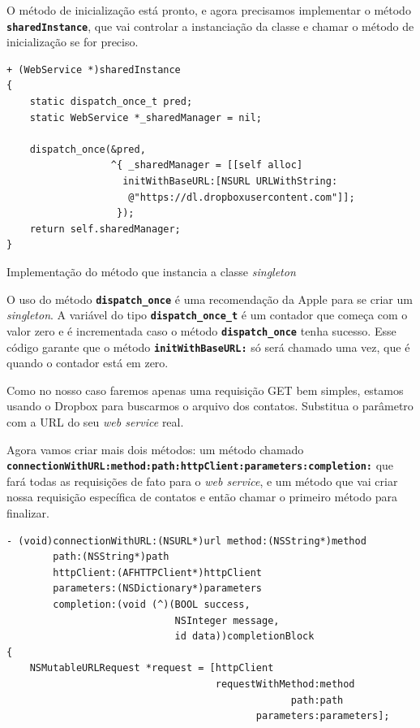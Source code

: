 \documentclass[a4paper,12pt,brazil,doubleside]{book}
\begin{document}
\begin{singlespace}
O método de inicialização está pronto, e agora precisamos implementar o método\\ \texttt{\textbf{sharedInstance}}, que vai controlar a instanciação da classe e chamar o método de inicialização se for preciso.

\begin{listing}[H]
\begin{verbatim}
+ (WebService *)sharedInstance
{
    static dispatch_once_t pred;
    static WebService *_sharedManager = nil;
    
    dispatch_once(&pred,
                  ^{ _sharedManager = [[self alloc]
                    initWithBaseURL:[NSURL URLWithString:
                     @"https://dl.dropboxusercontent.com"]];
                   });
    return self.sharedManager;
}
\end{verbatim}
\caption{Implementação do método que instancia a classe \emph{singleton}}
\end{listing}


O uso do método \texttt{\textbf{dispatch\_once}} é uma recomendação da Apple para se criar um \emph{singleton}. A variável do tipo \texttt{\textbf{dispatch\_once\_t}} é um contador que começa com o valor zero e é incrementada caso o método \texttt{\textbf{dispatch\_once}} tenha sucesso. Esse código garante que o método \texttt{\textbf{initWithBaseURL:}} só será chamado uma vez, que é quando o contador está em zero.

Como no nosso caso faremos apenas uma requisição GET bem simples, estamos usando o Dropbox para buscarmos o arquivo dos contatos. Substitua o parâmetro com a URL do seu \emph{web service} real.

Agora vamos criar mais dois métodos: um método chamado \\ \texttt{\textbf{connectionWithURL:method:path:httpClient:parameters:completion:}} que fará todas as requisições de fato para o \emph{web service}, e um método que vai criar nossa requisição específica de contatos e então chamar o primeiro método para finalizar.

\begin{listing}[H]
\begin{verbatim}
- (void)connectionWithURL:(NSURL*)url method:(NSString*)method
        path:(NSString*)path
        httpClient:(AFHTTPClient*)httpClient
        parameters:(NSDictionary*)parameters
        completion:(void (^)(BOOL success,
                             NSInteger message,
                             id data))completionBlock
{
    NSMutableURLRequest *request = [httpClient
                                    requestWithMethod:method
                                                 path:path
                                           parameters:parameters];
    

\end{verbatim}
\end{listing}
\end{singlespace}
\end{document}

